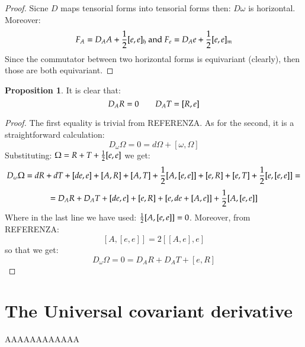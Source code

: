 \documentclass[12pt,a4paper]{report}
\theoremstyle{definition}
\theoremstyle{Theorem}
\newtheorem{Prop}[Def]{Proposition}
\theoremstyle{break}
\theoremstyle{definition}
\begin{document}
	\begin{proof}
		Sicne $D$ maps tensorial forms into tensorial forms then: $D\omega$ is horizontal. Moreover:
		$$F_A=D_AA+{1\over 2}[e,e]_\mathfrak{h}\hbox{ and }F_e=D_Ae+{1\over 2}[e,e]_\mathfrak{m}$$
		Since the commutator between two horizontal forms is equivariant (clearly), then those are both equivariant.
	\end{proof}
	\begin{Prop}
		It is clear that:
		$$D_AR=0\hspace{20 pt}D_AT=[R,e]$$
	\end{Prop}
	\begin{proof}
		The first equality is trivial from REFERENZA. As for the second, it is a straightforward calculation:
		$$D_\omega \Omega=0=d\Omega+[\omega,\Omega]$$
		Substituting: $\Omega=R+T+{1\over 2}[e,e]$ we get:
		$$D_\omega \Omega=dR+dT+[de,e]+[A,R]+[A,T]+{1\over 2}[A,[e,e]]+[e,R]+[e,T]+{1\over 2}[e,[e,e]]=$$
		$$=D_AR+D_AT+[de,e]+[e,R]+[e,de+[A,e]]+{1\over 2}[A,[e,e]]$$
		Where in the last line we have used: ${1\over 2}[A,[e,e]]=0$. Moreover, from REFERENZA:
		$$[A,[e,e]]=2[[A,e],e]$$
		so that we get:
		$$D_\omega\Omega=0=D_AR+D_AT+[e,R]$$ 
	\end{proof}
	\section{The Universal covariant derivative}
	AAAAAAAAAAAA
\end{document}
